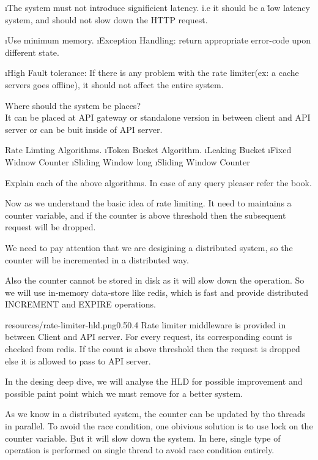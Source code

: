 \lstart
    \i The system must not introduce significient latency. i.e it should be a \u{low latency} system, and should not slow down the HTTP request.
    
    \i Use minimum memory.
    \i  Exception Handling: return appropriate error-code upon different state.

    \i High Fault tolerance: If there is any problem with the rate limiter(ex: a cache servers goes offline), it should not affect the entire system.
\lend


Where should the system be places?\\
It can be placed at API gateway or standalone version in between client and API server or can be buit inside of API server.

Rate Limting Algorithms.
\ls
    \i Token Bucket Algorithm.
    \i Leaking Bucket
    \i Fixed Widnow Counter
    \i Sliding Window long
    \i Sliding Window Counter
\le

Explain each of the above algorithms. In case of any query pleaser refer the book.


Now as we understand the basic idea of rate limiting. It need to maintains a counter variable, and if the counter is above threshold then the subsequent request will be dropped. 

We need to pay attention that we are desigining a distributed system, so the counter will be incremented in a distributed way. 

Also the counter cannot be stored in disk as it will slow down the operation. So we will use in-memory data-store like redis, which is fast and provide distributed INCREMENT and EXPIRE operations. 

\begin{lfigure}{resources/rate-limiter-hld.png}{0.5}{0.4}
    Rate limiter middleware is provided in between Client and API server. For every request, its corresponding count is checked from redis. If the count is above threshold then the request is dropped else it is allowed to pass to API server.
\end{lfigure}

    In the desing deep dive, we will analyse the HLD for possible improvement and possible paint point which we must remove for a better system.

    As we know in a distributed system, the counter can be updated by tho threads in parallel. To avoid the race condition, one obivious solution is to use lock on the counter variable. \b{But it will slow down the system.}
    In here, single type of operation is performed on single thread to avoid race condition entirely.

